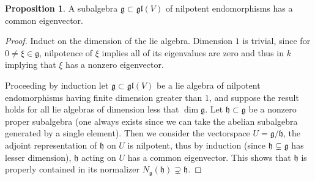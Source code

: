 \documentclass[10.5pt]{article}
\theoremstyle{definition}
\newtheorem{proposition}{Proposition}
\numberwithin{example}{subsection}
\numberwithin{proposition}{subsection}
\numberwithin{pb}{subsection}
\begin{document}
        \begin{proposition}\label{engelstheoremlemma}
            A subalgebra \(\mathfrak{g} \subset \mathfrak{gl}(V)\) of nilpotent endomorphisms has a common eigenvector.
            \begin{proof}
                Induct on the dimension of the lie algebra. Dimension \(1\) is trivial, since for \(0 \neq \xi \in \mathfrak{g}\), nilpotence of \(\xi\) implies all of its eigenvalues are zero and thus in \(k\) implying that \(\xi\) has a nonzero eigenvector.

                Proceeding by induction let \(\mathfrak{g} \subset \mathfrak{gl}(V)\) be a lie algebra of nilpotent endomorphisms having finite dimension greater than \(1\), and suppose the result holds for all lie algebras of dimension less that \(\dim \mathfrak{g}\). Let \(\mathfrak{h} \subset \mathfrak{g}\) be a nonzero proper subalgebra (one always exists since we can take the abelian subalgebra generated by a single element). Then we consider the vectorspace \(U = \mathfrak{g}/\mathfrak{h}\), the adjoint representation of \(\mathfrak{h}\) on \(U\) is nilpotent, thus by induction (since \(\mathfrak{h} \subsetneq \mathfrak{g}\) has lesser dimension), \(\mathfrak{h}\) acting on \(U\) has a common eigenvector. This shows that \(\mathfrak{h}\) is properly contained in its normalizer \(N_\mathfrak{g}(\mathfrak{h}) \supsetneq \mathfrak{h}\).


\end{proof}
\end{proposition}
\end{document}
